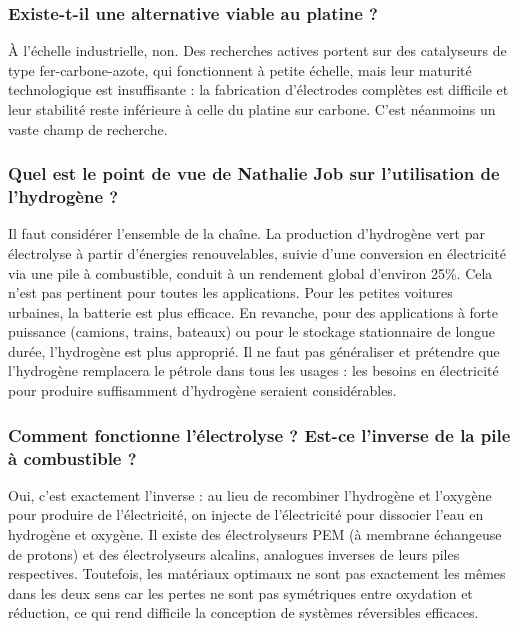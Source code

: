 \subsubsection{Existe-t-il une alternative viable au platine ?}

À l'échelle industrielle, non. Des recherches actives portent sur des catalyseurs de type fer-carbone-azote, qui fonctionnent à petite échelle, mais leur maturité technologique est insuffisante : la fabrication d'électrodes complètes est difficile et leur stabilité reste inférieure à celle du platine sur carbone. C'est néanmoins un vaste champ de recherche.

\subsubsection{Quel est le point de vue de Nathalie Job sur l'utilisation de l'hydrogène ?}

Il faut considérer l'ensemble de la chaîne. La production d'hydrogène vert par électrolyse à partir d'énergies renouvelables, suivie d'une conversion en électricité via une pile à combustible, conduit à un rendement global d'environ 25\%. Cela n'est pas pertinent pour toutes les applications. Pour les petites voitures urbaines, la batterie est plus efficace. En revanche, pour des applications à forte puissance (camions, trains, bateaux) ou pour le stockage stationnaire de longue durée, l'hydrogène est plus approprié. Il ne faut pas généraliser et prétendre que l'hydrogène remplacera le pétrole dans tous les usages : les besoins en électricité pour produire suffisamment d'hydrogène seraient considérables.

\subsubsection{Comment fonctionne l'électrolyse ? Est-ce l'inverse de la pile à combustible ?}

Oui, c'est exactement l'inverse : au lieu de recombiner l'hydrogène et l'oxygène pour produire de l'électricité, on injecte de l'électricité pour dissocier l'eau en hydrogène et oxygène. Il existe des électrolyseurs PEM (à membrane échangeuse de protons) et des électrolyseurs alcalins, analogues inverses de leurs piles respectives. Toutefois, les matériaux optimaux ne sont pas exactement les mêmes dans les deux sens car les pertes ne sont pas symétriques entre oxydation et réduction, ce qui rend difficile la conception de systèmes réversibles efficaces.

